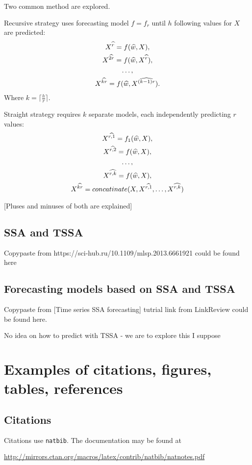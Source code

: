 \documentclass{article}
\begin{document}
Two common method are explored.

Recursive strategy uses forecasting model \(f = f_r\) until \(h\) following values for \(X\) are predicted:
\begin{gather}
	X^{\widehat{r}} = f(\widehat{w}, X), \notag \\
	X^{\widehat{2r}} = f(\widehat{w}, X^{\widehat{r}}),\notag \\
	\dots, \\
	X^{\widehat{kr}} = f(\widehat{w}, X^{\widehat{(k-1)r}}).\notag
\end{gather}
Where \( k = \lceil \frac{h}{r} \rceil.\)

Straight strategy requires \(k\) separate models, each independently predicting \(r\) values:
\begin{gather}
	X^{\widehat{r, 1}} = f_1(\widehat{w}, X), \notag \\
	X^{\widehat{r, 2}} = f(\widehat{w}, X), \notag \\
	\dots, \\
	X^{\widehat{r, k}} = f(\widehat{w}, X), \notag \\
	X^{\widehat{kr}} = concatinate(X, X^{\widehat{r, 1}}, \dots, X^{\widehat{r, k}}) \notag
\end{gather}

[Pluses and minuses of both are explained]

\subsection{SSA and TSSA}

Copypaste from https://sci-hub.ru/10.1109/mlsp.2013.6661921 could be found here

\subsection{Forecasting models based on SSA and TSSA}

Copypaste from [Time series SSA forecasting] tutrial link from LinkReview could be found here.

No idea on how to predict with TSSA - we are to explore this I suppose

\section{Examples of citations, figures, tables, references}
\label{sec:others}

\subsection{Citations}
Citations use \verb+natbib+. The documentation may be found at
\begin{center}
	\url{http://mirrors.ctan.org/macros/latex/contrib/natbib/natnotes.pdf}
\end{center}
\end{document}

